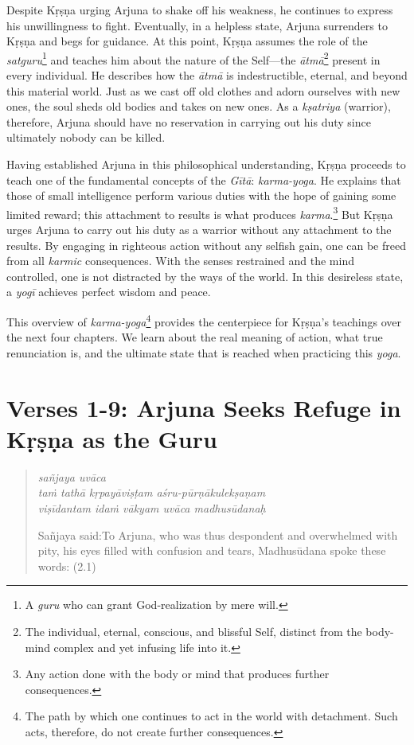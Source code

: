 \documentclass[12pt, twoside, openright]{memoir}
\begin{document}
\noindent Despite Kṛṣṇa urging Arjuna to shake off his weakness, he continues to express his unwillingness to fight. Eventually, in a helpless state, Arjuna surrenders to Kṛṣṇa and begs for guidance. At this point, Kṛṣṇa assumes the role of the \textit{satguru}\footnote{A \textit{guru} who can grant God-realization by mere will.} and teaches him about the nature of the Self---the \textit{ātmā}\footnote{The individual, eternal, conscious, and blissful Self, distinct from the body-mind complex and yet infusing life into it.} present in every individual. He describes how the \textit{ātmā} is indestructible, eternal, and beyond this material world. Just as we cast off old clothes and adorn ourselves with new ones, the soul sheds old bodies and takes on new ones. As a \textit{kṣatriya} (warrior), therefore, Arjuna should have no reservation in carrying out his duty since ultimately nobody can be killed.

Having established Arjuna in this philosophical understanding, Kṛṣṇa proceeds to teach one of the fundamental concepts of the \textit{Gītā}: \textit{karma-yoga}. He explains that those of small intelligence perform various duties with the hope of gaining some limited reward; this attachment to results is what produces \textit{karma}.\footnote{Any action done with the body or mind that produces further consequences.} But Kṛṣṇa urges Arjuna to carry out his duty as a warrior without any attachment to the results. By engaging in righteous action without any selfish gain, one can be freed from all \textit{karmic} consequences. With the senses restrained and the mind controlled, one is not distracted by the ways of the world. In this desireless state, a \textit{yogī} achieves perfect wisdom and peace.

This overview of \textit{karma-yoga}\footnote{The path by which one continues to act in the world with detachment. Such acts, therefore, do not create further consequences.
} provides the centerpiece for Kṛṣṇa's teachings over the next four chapters. We learn about the real meaning of action, what true renunciation is, and the ultimate state that is reached when practicing this \textit{yoga}.

\section{Verses 1-9: Arjuna Seeks Refuge in Kṛṣṇa as the Guru}\label{sec-verses-1-9-arjuna-seeks-refuge-in-krsna-as-the-guru}


\par
\begin{verse}
\textit{sañjaya uvāca} \\
\textit{taṁ tathā kṛpayāviṣṭam aśru-pūrṇākulekṣaṇam} \\
\textit{viṣīdantam idaṁ vākyam uvāca madhusūdanaḥ}

\noindent \quad Sañjaya said:\linebreak To Arjuna, who was thus despondent and overwhelmed with pity, his eyes filled with confusion and tears, Madhusūdana spoke these words: (2.1)
\end{verse}
\par
\end{document}
